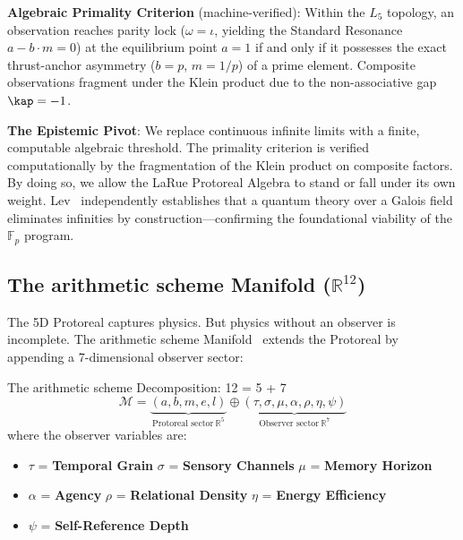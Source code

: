 \textbf{Algebraic Primality Criterion} (machine-verified): Within the $L_5$ topology, an observation reaches parity lock ($\omega = \iota$, yielding the Standard Resonance $a - b \cdot m = 0$) at the equilibrium point $a = 1$ if and only if it possesses the exact thrust-anchor asymmetry ($b = p$, $m = 1/p$) of a prime element. Composite observations fragment under the Klein product due to the non-associative gap $\kap = -1$.

\textbf{The Epistemic Pivot}: We replace continuous infinite limits with a finite, computable algebraic threshold. The primality criterion is verified computationally by the fragmentation of the Klein product on composite factors. By doing so, we allow the LaRue Protoreal Algebra to stand or fall under its own weight. Lev~\cite{Lev2010} independently establishes that a quantum theory over a Galois field eliminates infinities by construction---confirming the foundational viability of the $\mathbb{F}_p$ program.

\subsection{The arithmetic scheme Manifold ($\mathbb{R}^{12}$)}

The 5D Protoreal captures physics. But physics without an observer is incomplete. The arithmetic scheme Manifold~\cite{arithmetic schemeManifold} extends the Protoreal by appending a 7-dimensional observer sector:

\begin{arithmetic schemebox}{The arithmetic scheme Decomposition: 12 = 5 + 7}
\begin{equation}
    \mathcal{M} = \underbrace{(a, b, m, e, l)}_{\text{Protoreal sector} \ \mathbb{R}^5} \oplus \underbrace{(\tau, \sigma, \mu, \alpha, \rho, \eta, \psi)}_{\text{Observer sector} \ \mathbb{R}^7}
\end{equation}
where the observer variables are:
\begin{itemize}
    \item $\tau$ = \textbf{Temporal Grain} \quad $\sigma$ = \textbf{Sensory Channels} \quad $\mu$ = \textbf{Memory Horizon}
    \item $\alpha$ = \textbf{Agency} \quad $\rho$ = \textbf{Relational Density} \quad $\eta$ = \textbf{Energy Efficiency}
    \item $\psi$ = \textbf{Self-Reference Depth}
\end{itemize}
\end{arithmetic schemebox}

